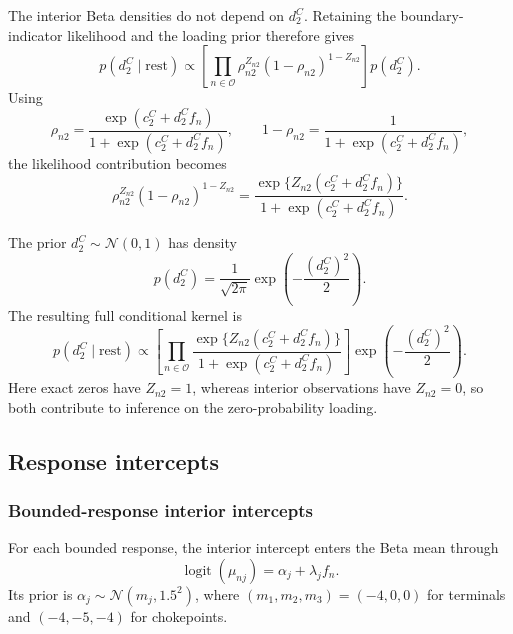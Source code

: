 \documentclass[pdftex,12pt,openright,a4paper,oneside]{book}
\begin{document}
The interior Beta densities do not depend on $d_2^C$.
Retaining the boundary-indicator likelihood
and the loading prior therefore gives
\begin{equation*}
p(d_2^C\mid\mathrm{rest})
\propto
\left[
\prod_{n\in\mathcal{O}}
\rho_{n2}^{Z_{n2}}
(1-\rho_{n2})^{1-Z_{n2}}
\right]
p(d_2^C).
\end{equation*}
Using
\begin{equation*}
\rho_{n2}=
\frac{\exp(c_2^C+d_2^Cf_n)}
{1+\exp(c_2^C+d_2^Cf_n)},
\qquad
1-\rho_{n2}=
\frac{1}{1+\exp(c_2^C+d_2^Cf_n)},
\end{equation*}
the likelihood contribution becomes
\begin{equation*}
\rho_{n2}^{Z_{n2}}
(1-\rho_{n2})^{1-Z_{n2}}
=
\frac{
\exp\{Z_{n2}(c_2^C+d_2^Cf_n)\}
}{
1+\exp(c_2^C+d_2^Cf_n)
}.
\end{equation*}

The prior $d_2^C\sim\mathcal{N}(0,1)$ has density
\begin{equation*}
p(d_2^C)
=
\frac{1}{\sqrt{2\pi}}
\exp\!\left(-\frac{(d_2^C)^2}{2}\right).
\end{equation*}
The resulting full conditional kernel is
\begin{equation*}
p(d_2^C\mid\mathrm{rest})
\propto
\left[
\prod_{n\in\mathcal{O}}
\frac{
\exp\{Z_{n2}(c_2^C+d_2^Cf_n)\}
}{
1+\exp(c_2^C+d_2^Cf_n)
}
\right]
\exp\!\left(-\frac{(d_2^C)^2}{2}\right).
\end{equation*}
Here exact zeros have $Z_{n2}=1$, whereas interior
observations have $Z_{n2}=0$, so both contribute
to inference on the zero-probability loading.

\subsection{Response intercepts}
\label{app:intercept_conditionals}

\subsubsection{Bounded-response interior intercepts}

For each bounded response, the interior intercept
enters the Beta mean through
\begin{equation*}
\operatorname{logit}(\mu_{nj})
=
\alpha_j+\lambda_jf_n.
\end{equation*}
Its prior is
$\alpha_j\sim\mathcal{N}(m_j,1.5^2)$,
where $(m_1,m_2,m_3)=(-4,0,0)$ for terminals
and $(-4,-5,-4)$ for chokepoints.
\end{document}

